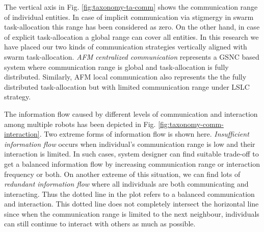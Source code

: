 \documentclass[journal]{IEEEtran}
\begin{document}
The vertical axis in Fig. \ref{fig:taxonomy-ta-comm} shows the communication range of individual entities. In case of implicit communication via stigmergy in swarm task-allocation this range has been considered as zero. On the other hand, in case of explicit task-allocation a global range can cover all entities. In this research we have placed our two kinds of communication strategies vertically aligned with swarm task-allocation. \textit{AFM centralized communication} represents a GSNC based system where communication range is global and task-allocation is fully distributed. Similarly, AFM local communication also represents the the fully distributed task-allocation but with limited communication range under LSLC strategy.

The information flow caused by different levels of communication and interaction among multiple robots has been depicted in Fig. \ref{fig:taxonomy-comm-interaction}. %
Two extreme forms of information flow is shown here. \textit{Insufficient information flow} occurs when individual's communication range is low and their interaction is limited. In such cases, system designer can find suitable trade-off to get a balanced information flow by increasing  communication range or interaction frequency or both.   On another extreme of this situation, we can find lots of \textit{redundant information flow} where all individuals are both communicating and interacting. Thus the dotted line in the plot refers to a balanced communication and  interaction. This dotted line does not completely intersect the horizontal line since when the communication range is limited to the next neighbour, individuals can still continue to interact with others as much as possible. 
\end{document}
